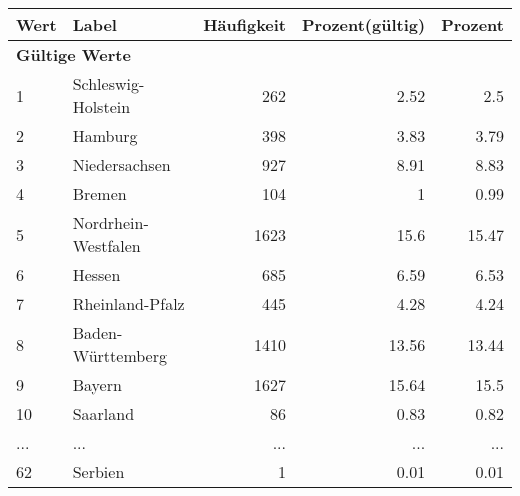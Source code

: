      \begin{longtable}{lXrrr}
     \toprule
     \textbf{Wert} & \textbf{Label} & \textbf{Häufigkeit} & \textbf{Prozent(gültig)} & \textbf{Prozent} \\
     \endhead
     \midrule
     \multicolumn{5}{l}{\textbf{Gültige Werte}}\\
        1 & \multicolumn{1}{X}{Schleswig-Holstein} & %
          \num{262} &
          \num[round-mode=places,round-precision=2]{2,52} &
          \num[round-mode=places,round-precision=2]{2,5} \\
        2 & \multicolumn{1}{X}{Hamburg} & %
          \num{398} &
          \num[round-mode=places,round-precision=2]{3,83} &
          \num[round-mode=places,round-precision=2]{3,79} \\
        3 & \multicolumn{1}{X}{Niedersachsen} & %
          \num{927} &
          \num[round-mode=places,round-precision=2]{8,91} &
          \num[round-mode=places,round-precision=2]{8,83} \\
        4 & \multicolumn{1}{X}{Bremen} & %
          \num{104} &
          \num[round-mode=places,round-precision=2]{1} &
          \num[round-mode=places,round-precision=2]{0,99} \\
        5 & \multicolumn{1}{X}{Nordrhein-Westfalen} & %
          \num{1623} &
          \num[round-mode=places,round-precision=2]{15,6} &
          \num[round-mode=places,round-precision=2]{15,47} \\
        6 & \multicolumn{1}{X}{Hessen} & %
          \num{685} &
          \num[round-mode=places,round-precision=2]{6,59} &
          \num[round-mode=places,round-precision=2]{6,53} \\
        7 & \multicolumn{1}{X}{Rheinland-Pfalz} & %
          \num{445} &
          \num[round-mode=places,round-precision=2]{4,28} &
          \num[round-mode=places,round-precision=2]{4,24} \\
        8 & \multicolumn{1}{X}{Baden-Württemberg} & %
          \num{1410} &
          \num[round-mode=places,round-precision=2]{13,56} &
          \num[round-mode=places,round-precision=2]{13,44} \\
        9 & \multicolumn{1}{X}{Bayern} & %
          \num{1627} &
          \num[round-mode=places,round-precision=2]{15,64} &
          \num[round-mode=places,round-precision=2]{15,5} \\
        10 & \multicolumn{1}{X}{Saarland} & %
          \num{86} &
          \num[round-mode=places,round-precision=2]{0,83} &
          \num[round-mode=places,round-precision=2]{0,82} \\
       ... & ... & ... & ... & ... \\
        62 & \multicolumn{1}{X}{Serbien} & %
          \num{1} &
          \num[round-mode=places,round-precision=2]{0,01} &
          \num[round-mode=places,round-precision=2]{0,01} \\


\end{longtable}
